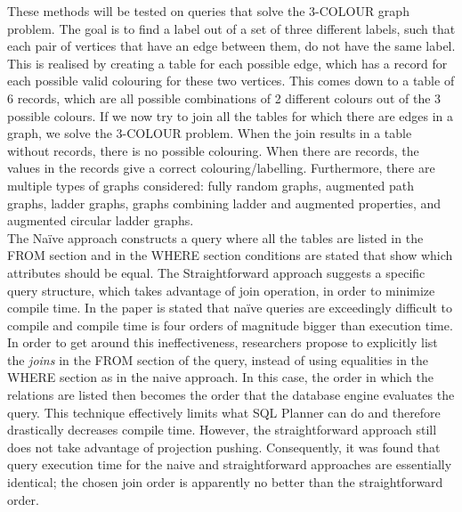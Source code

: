 These methods will be tested on queries that solve the 3-COLOUR graph problem. The goal is to find a label out of a set of three different labels, such that each pair of vertices that have an edge between them, do not have the same label. This is realised by creating a table for each possible edge, which has a record for each possible valid colouring for these two vertices. This comes down to a table of 6 records, which are all possible combinations of 2 different colours out of the 3 possible colours. If we now try to join all the tables for which there are edges in a graph, we solve the 3-COLOUR problem. When the join results in a table without records, there is no possible colouring. When there are records, the values in the records give a correct colouring/labelling. Furthermore, there are multiple types of graphs considered: fully random graphs, augmented path graphs, ladder graphs, graphs combining ladder and augmented properties, and augmented circular ladder graphs. \\

The Na\"ive approach constructs a query where all the tables are listed in the FROM section and in the WHERE section conditions are stated that show which attributes should be equal. The Straightforward approach suggests a specific query structure, which takes advantage of join operation, in order to minimize compile time. In the paper is stated that na\"ive queries are exceedingly difficult to compile and compile time is four orders of magnitude bigger than execution time. In order to get around this ineffectiveness, researchers propose to explicitly list the \textit{joins} in the FROM section of the query, instead of using equalities in the WHERE section as in the naive approach. In this case, the order in which the relations are listed then becomes the order that the database engine evaluates the query. This technique effectively limits what SQL Planner can do and therefore drastically decreases compile time. However, the straightforward approach still does not take advantage of projection pushing. Consequently, it was found that query execution time for the naive and straightforward approaches are essentially identical; the chosen join order is apparently no better than the straightforward order. \\

